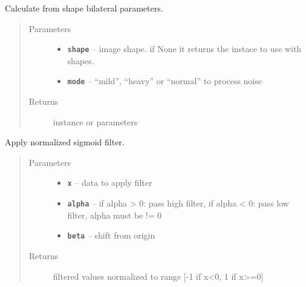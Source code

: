 \documentclass[letterpaper,10pt,english]{sphinxmanual}
\begin{document}

\begin{fulllineitems}
\label{RRtoolbox.lib.arrayops:RRtoolbox.lib.arrayops.filters.getBilateralParameters}
Calculate from shape bilateral parameters.
\begin{quote}\begin{description}
\item[{Parameters}] \leavevmode\begin{itemize}
\item {} 
\textbf{\texttt{shape}} -- image shape. if None it returns the instace to use with shapes.

\item {} 
\textbf{\texttt{mode}} -- ``mild'', ``heavy'' or ``normal'' to process noise

\end{itemize}

\item[{Returns}] \leavevmode
instance or parameters

\end{description}\end{quote}

\end{fulllineitems}


\begin{fulllineitems}
\label{RRtoolbox.lib.arrayops:RRtoolbox.lib.arrayops.filters.normsigmoid}
Apply normalized sigmoid filter.
\begin{quote}\begin{description}
\item[{Parameters}] \leavevmode\begin{itemize}
\item {} 
\textbf{\texttt{x}} -- data to apply filter

\item {} 
\textbf{\texttt{alpha}} -- if alpha \textgreater{} 0: pass high filter, if alpha \textless{} 0: pass low filter, alpha must be != 0

\item {} 
\textbf{\texttt{beta}} -- shift from origin

\end{itemize}

\item[{Returns}] \leavevmode
filtered values normalized to range {[}-1 if x\textless{}0, 1 if x\textgreater{}=0{]}

\end{description}\end{quote}

\end{fulllineitems}
\end{document}
